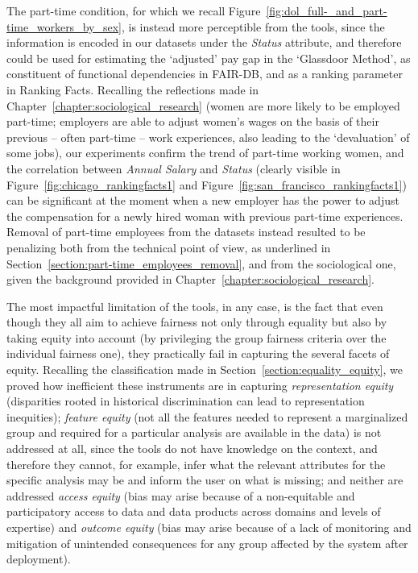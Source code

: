 The part-time condition, for which we recall Figure~\ref{fig:dol_full-_and_part-time_workers_by_sex}, is instead more perceptible from the tools, since the information is encoded in our datasets under the \textit{Status} attribute, and therefore could be used for estimating the `adjusted' pay gap in the `Glassdoor Method', as constituent of functional dependencies in FAIR-DB, and as a ranking parameter in Ranking Facts. Recalling the reflections made in Chapter~\ref{chapter:sociological_research} (women are more likely to be employed part-time; employers are able to adjust women's wages on the basis of their previous -- often part-time -- work experiences, also leading to the `devaluation' of some jobs), our experiments confirm the trend of part-time working women, and the correlation between \textit{Annual Salary} and \textit{Status} (clearly visible in Figure~\ref{fig:chicago_rankingfacts1} and Figure~\ref{fig:san_francisco_rankingfacts1}) can be significant at the moment when a new employer has the power to adjust the compensation for a newly hired woman with previous part-time experiences.
Removal of part-time employees from the datasets instead resulted to be penalizing both from the technical point of view, as underlined in Section~\ref{section:part-time_employees_removal}, and from the sociological one, given the background provided in Chapter~\ref{chapter:sociological_research}.

The most impactful limitation of the tools, in any case, is the fact that even though they all aim to achieve fairness not only through equality but also by taking equity into account (by privileging the group fairness criteria over the individual fairness one), they practically fail in capturing the several facets of equity. Recalling the classification made in Section~\ref{section:equality_equity}, we proved how inefficient these instruments are in capturing \textit{representation equity} (disparities rooted in historical discrimination can lead to representation inequities); \textit{feature equity} (not all the features needed to represent a marginalized group and required for a particular analysis are available in the data) is not addressed at all, since the tools do not have knowledge on the context, and therefore they cannot, for example, infer what the relevant attributes for the specific analysis may be and inform the user on what is missing; and neither are addressed \textit{access equity} (bias may arise because of a non-equitable and participatory access to data and data products across domains and levels of expertise) and \textit{outcome equity} (bias may arise because of a lack of monitoring and mitigation of unintended consequences for any group affected by the system after deployment).

